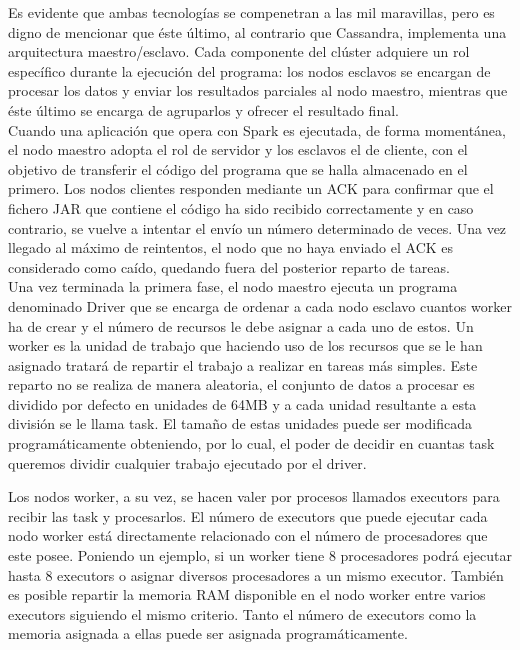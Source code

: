 Es evidente que ambas tecnologías se compenetran a las mil maravillas, pero es digno de mencionar que éste último, al contrario que Cassandra, implementa una arquitectura maestro/esclavo. Cada componente del clúster adquiere un rol específico durante la ejecución del programa: los nodos esclavos se encargan de procesar los datos y enviar los resultados parciales al nodo maestro, mientras que éste último se encarga de agruparlos y ofrecer el resultado final.\\
 
Cuando una aplicación que opera con Spark es ejecutada, de forma momentánea, el nodo maestro adopta  el rol de servidor y los esclavos el de cliente, con el objetivo de transferir el código del programa que se halla almacenado en el primero. Los nodos clientes responden mediante un ACK para confirmar que el fichero JAR que contiene el código ha sido recibido correctamente y en caso contrario, se vuelve a intentar el envío un número determinado de veces. Una vez llegado al máximo de reintentos, el nodo que no haya enviado el ACK es considerado como caído, quedando fuera del posterior reparto de tareas.\\ 

Una vez terminada la primera fase, el nodo maestro ejecuta un programa denominado Driver que se encarga de ordenar a cada nodo esclavo cuantos worker ha de crear y el número de recursos le debe asignar a cada uno de estos. Un worker es la unidad de trabajo que haciendo uso de los recursos que se le han asignado tratará de repartir el trabajo a realizar en tareas más simples. Este reparto no se realiza de manera aleatoria, el conjunto de datos a procesar es dividido por defecto en unidades de 64MB y a cada unidad resultante a esta división se le llama task. El tamaño de estas unidades puede ser modificada programáticamente obteniendo, por lo cual, el poder de decidir en cuantas task queremos dividir cualquier trabajo ejecutado por el driver.

Los nodos worker, a su vez, se hacen valer por procesos llamados executors para recibir las task y procesarlos. El número de executors que puede ejecutar cada nodo worker está directamente relacionado con el número de procesadores que este posee. Poniendo un ejemplo, si un worker tiene 8 procesadores podrá ejecutar hasta 8 executors o asignar diversos procesadores a un mismo executor. También es posible repartir la memoria RAM disponible en el nodo worker entre varios executors siguiendo el mismo criterio. Tanto el número de executors como la memoria asignada a ellas puede ser asignada programáticamente.


